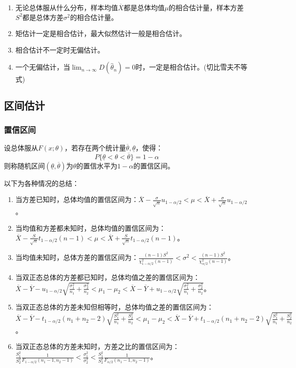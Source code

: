 \documentclass[a4paper,12pt]{ctexart}
\begin{document}
\begin{enumerate}
	\item 无论总体服从什么分布，样本均值$\overline{X}$都是总体均值$\mu$的相合估计量，样本方差$S^2$都是总体方差$\sigma^2$的相合估计量。
	\item 矩估计一定是相合估计，最大似然估计一般是相合估计。
	\item 相合估计不一定时无偏估计。
	\item 一个无偏估计，当$\lim_{n\rightarrow\infty}D(\hat{\theta}_n) = 0$时，一定是相合估计。(切比雪夫不等式)
\end{enumerate}

\subsection{区间估计}

\subsubsection{置信区间}

设总体服从$F(x;\theta)$，若存在两个统计量$\overline{\theta},\underline{\theta}$，使得：
\begin{equation*}
	P\{\underline{\theta} < \theta < \overline{\theta}\} = 1 - \alpha
\end{equation*}
则称随机区间$(\underline{\theta},\overline{\theta})$为$\theta$的置信水平为$1 - \alpha$的置信区间。

以下为各种情况的总结：
\begin{enumerate}
	\item 当方差已知时，总体均值的置信区间为：$\overline{X} - \frac{\sigma}{\sqrt{n}}u_{1-\alpha/2} < \mu < \overline{X} + \frac{\sigma}{\sqrt{n}}u_{1-\alpha/2}$。
	\item 当均值和方差都未知时，总体均值的置信区间为：$\overline{X} - \frac{S}{\sqrt{n}}t_{1-\alpha/2}(n-1) < \mu < \overline{X} + \frac{S}{\sqrt{n}}t_{1-\alpha/2}(n-1)$。
	\item 当均值未知时，总体方差的置信区间为：$\frac{(n-1)S^2}{\chi_{1-\alpha/2}^2(n-1)} < \sigma^2 < \frac{(n-1)S^2}{\chi_{\alpha/2}^2(n-1)}$。
	\item 当双正态总体的方差都已知时，总体均值之差的置信区间为：$\overline{X} - \overline{Y} - u_{1-\alpha/2}\sqrt{\frac{\sigma_1^2}{n_1} + \frac{\sigma_2^2}{n_2}} < \mu_1 - \mu_2 < \overline{X} - \overline{Y} + u_{1-\alpha/2}\sqrt{\frac{\sigma_1^2}{n_1} + \frac{\sigma_2^2}{n_2}}$。
	\item 当双正态总体的方差未知但相等时，总体均值之差的置信区间为：$\overline{X} - \overline{Y} - t_{1-\alpha/2}(n_1 + n_2 - 2)\sqrt{\frac{S_1^2}{n_1} + \frac{S_2^2}{n_2}} < \mu_1 - \mu_2 < \overline{X} - \overline{Y} + t_{1-\alpha/2}(n_1 + n_2 - 2)\sqrt{\frac{S_1^2}{n_1} + \frac{S_2^2}{n_2}}$。
	\item 当双正态总体的方差未知时，方差之比的置信区间为：$\frac{S_1^2}{S_2^2}\frac{1}{F_{1-\alpha/2}(n_1 - 1,n_2 - 1)} < \frac{\sigma_1^2}{\sigma_2^2} < \frac{S_1^2}{S_2^2}\frac{1}{F_{\alpha/2}(n_1 - 1,n_2 - 1)}$。
\end{enumerate}
\end{document}
